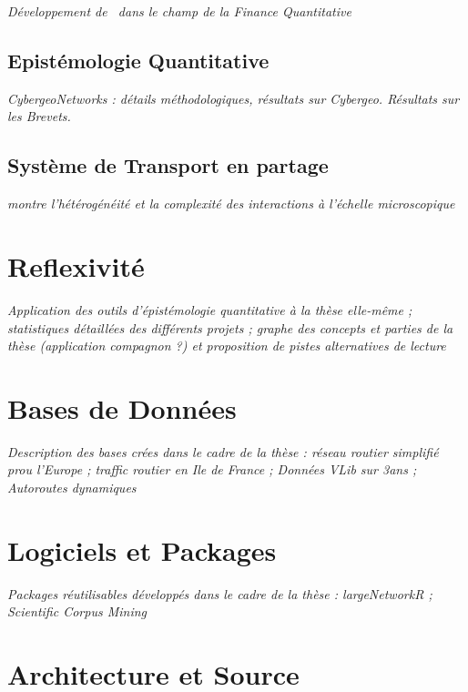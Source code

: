 \textit{Développement de~\cite{raimbault2016generation} dans le champ de la Finance Quantitative}


\subsection{Epistémologie Quantitative}

\textit{CybergeoNetworks : détails méthodologiques, résultats sur Cybergeo. Résultats sur les Brevets.}

\subsection{Système de Transport en partage}

\textit{\cite{raimbault2015hybrid} montre l'hétérogénéité et la complexité des interactions à l'échelle microscopique}







\section{Reflexivité}


\textit{Application des outils d'épistémologie quantitative à la thèse elle-même ; statistiques détaillées des différents projets ; graphe des concepts et parties de la thèse (application compagnon ?) et proposition de pistes alternatives de lecture}


\section{Bases de Données}


\textit{Description des bases crées dans le cadre de la thèse : réseau routier simplifié prou l'Europe ; traffic routier en Ile de France ; Données VLib sur 3ans ; Autoroutes dynamiques} 


\section{Logiciels et Packages}

\textit{Packages réutilisables développés dans le cadre de la thèse : largeNetworkR ; Scientific Corpus Mining}


\section{Architecture et Source}

